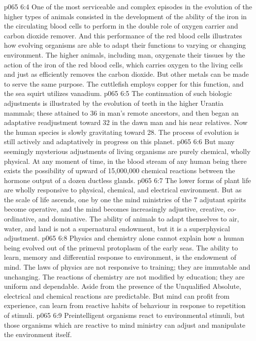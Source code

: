 \vs p065 6:4 One of the most serviceable and complex episodes in the evolution of the higher types of animals consisted in the development of the ability of the iron in the circulating blood cells to perform in the double role of oxygen carrier and carbon dioxide remover. And this performance of the red blood cells illustrates how evolving organisms are able to adapt their functions to varying or changing environment. The higher animals, including man, oxygenate their tissues by the action of the iron of the red blood cells, which carries oxygen to the living cells and just as efficiently removes the carbon dioxide. But other metals can be made to serve the same purpose. The cuttlefish employs copper for this function, and the sea squirt utilizes vanadium.
\vs p065 6:5 The continuation of such biologic adjustments is illustrated by the evolution of teeth in the higher Urantia mammals; these attained to 36 in man’s remote ancestors, and then began an adaptative readjustment toward 32 in the dawn man and his near relatives. Now the human species is slowly gravitating toward 28. The process of evolution is still actively and adaptatively in progress on this planet.
\vs p065 6:6 But many seemingly mysterious adjustments of living organisms are purely chemical, wholly physical. At any moment of time, in the blood stream of any human being there exists the possibility of upward of 15,000,000 chemical reactions between the hormone output of a dozen ductless glands.
\vs p065 6:7 \pc The lower forms of plant life are wholly responsive to physical, chemical, and electrical environment. But as the scale of life ascends, one by one the mind ministries of the 7 adjutant spirits become operative, and the mind becomes increasingly adjustive, creative, co\hyp{}ordinative, and dominative. The ability of animals to adapt themselves to air, water, and land is not a supernatural endowment, but it is a superphysical adjustment.
\vs p065 6:8 Physics and chemistry alone cannot explain how a human being evolved out of the primeval protoplasm of the early seas. The ability to learn, memory and differential response to environment, is the endowment of mind. The laws of physics are not responsive to training; they are immutable and unchanging. The reactions of chemistry are not modified by education; they are uniform and dependable. Aside from the presence of the Unqualified Absolute, electrical and chemical reactions are predictable. But mind can profit from experience, can learn from reactive habits of behaviour in response to repetition of stimuli.
\vs p065 6:9 Preintelligent organisms react to environmental stimuli, but those organisms which are reactive to mind ministry can adjust and manipulate the environment itself.
